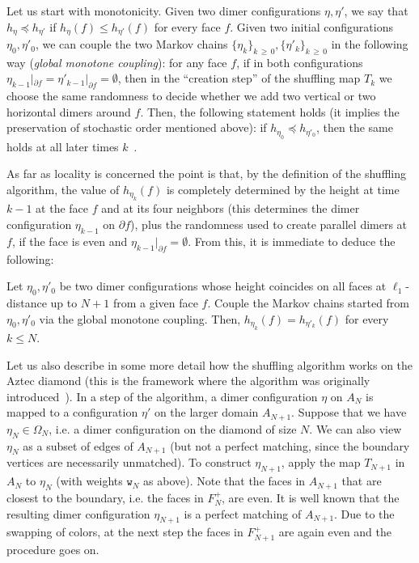 \documentclass[10pt]{amsart}
\theoremstyle{definition}\newtheorem{defi}[theo]{Definition}\newtheorem{rema}[theo]{Remark}\newtheorem{exam}[theo]{Example}\newtheorem{exem}[theo]{Example}\newtheorem{nota}[theo]{Notation}
\newcommand{\ttw}{\mathtt{w}}
\begin{document}
Let us start with monotonicity. Given two dimer configurations $\eta,\eta'$, we say that $h_\eta\preceq h_{\eta'}$ if $h_\eta(f)\leq h_{\eta'}(f)$ for every face $f$. Given two initial configurations $\eta_0,\eta'_0$, we can couple the two Markov chains $\{\eta_k\}_{k\,\ge\,0}, \{\eta'_k\}_{k\,\ge\,0}$ in the following way (\emph{global monotone coupling}): for any face $f$, if in both configurations $\eta_{k-1}|_{\partial f}=\eta'_{k-1}|_{\partial f}=\emptyset$, then in the ``creation step'' of the shuffling map $T_k$ we choose the same randomness to decide whether we add two vertical or two horizontal dimers around $f$. Then, the following statement holds (it implies the preservation of stochastic order mentioned above): if $h_{\eta_0}\preceq h_{\eta'_0}$, then the same holds at all later times $k$~\cite[Lemma~2.4]{zhang2018domino}.

As far as locality is concerned the point is that, by the definition of the shuffling algorithm, the value of $h_{\eta_k}(f)$ is completely determined by the height at time $k-1$ at the face $f$ and at its four neighbors (this determines the dimer configuration $\eta_{k-1}$ on $\partial f$), plus the randomness used to create parallel dimers at $f$, if the face is even and $\eta_{k-1}|_{\partial f}=\emptyset $. From this, it is immediate to deduce the following:
\begin{prop}\label{prop:loc}
Let $\eta_0,\eta'_0$ be two dimer configurations whose height coincides on all faces at $\ell_1$-distance up to $N+1$ from a given face $f$. Couple the Markov chains started from $\eta_0,\eta'_0$ via the global monotone coupling. Then, $h_{\eta_k}(f)=h_{\eta'_k}(f)$ for every $k\le N$.
\end{prop}

Let us also describe in some more detail how the shuffling algorithm works on the Aztec diamond (this is the framework where the algorithm was originally introduced~\cite{EKLP92,EKLP92b,Pro03}). In a step of the algorithm, a dimer configuration $\eta$ on $A_N$ is mapped to a configuration $\eta'$ on the larger domain $A_{N+1}$. Suppose that we have $\eta_{N}\in\Omega_{N}$, i.e. a dimer configuration on the diamond of size $N$. We can also view $\eta_{N}$ as a subset of edges of $A_{N+1}$ (but not a perfect matching, since the boundary vertices are necessarily unmatched). To construct $\eta_{N+1}$, apply the map $T_{N+1}$ in $A_N$ to $\eta_{N}$ (with weights $\ttw_N$ as above). Note that the faces in $A_{N+1}$ that are closest to the boundary, i.e. the faces in $F^+_{N}$, are even. It is well known that the resulting dimer configuration $\eta_{N+1}$ is a perfect matching of $A_{N+1}$. Due to the swapping of colors, at the next step the faces in $F^+_{N+1}$ are again even and the procedure goes on.
\end{document}
